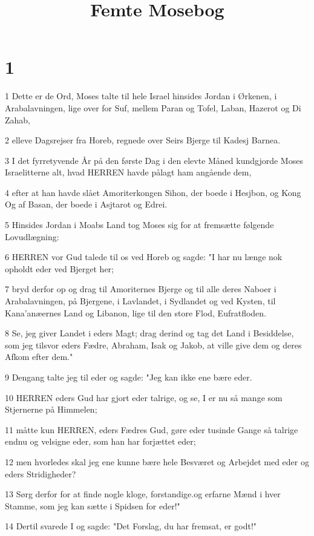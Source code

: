 

\title{Femte Mosebog}


\chapter{1}

\par 1 Dette er de Ord, Moses talte til hele Israel hinsides Jordan i Ørkenen, i Arabalavningen, lige over for Suf, mellem Paran og Tofel, Laban, Hazerot og Di Zahab,
\par 2 elleve Dagsrejser fra Horeb, regnede over Seirs Bjerge til Kadesj Barnea.
\par 3 I det fyrretyvende År på den første Dag i den elevte Måned kundgjorde Moses Israelitterne alt, hvad HERREN havde pålagt ham angående dem,
\par 4 efter at han havde slået Amoriterkongen Sihon, der boede i Hesjbon, og Kong Og af Basan, der boede i Asjtarot og Edrei.
\par 5 Hinsides Jordan i Moabs Land tog Moses sig for at fremsætte følgende Lovudlægning:
\par 6 HERREN vor Gud talede til os ved Horeb og sagde: "I har nu længe nok opholdt eder ved Bjerget her;
\par 7 bryd derfor op og drag til Amoriternes Bjerge og til alle deres Naboer i Arabalavningen, på Bjergene, i Lavlandet, i Sydlandet og ved Kysten, til Kana'anæernes Land og Libanon, lige til den store Flod, Eufratfloden.
\par 8 Se, jeg giver Landet i eders Magt; drag derind og tag det Land i Besiddelse, som jeg tilsvor eders Fædre, Abraham, Isak og Jakob, at ville give dem og deres Afkom efter dem."
\par 9 Dengang talte jeg til eder og sagde: "Jeg kan ikke ene bære eder.
\par 10 HERREN eders Gud har gjort eder talrige, og se, I er nu så mange som Stjernerne på Himmelen;
\par 11 måtte kun HERREN, eders Fædres Gud, gøre eder tusinde Gange så talrige endnu og velsigne eder, som han har forjættet eder;
\par 12 men hvorledes skal jeg ene kunne bære hele Besværet og Arbejdet med eder og eders Stridigheder?
\par 13 Sørg derfor for at finde nogle kloge, forstandige.og erfarne Mænd i hver Stamme, som jeg kan sætte i Spidsen for eder!"
\par 14 Dertil svarede I og sagde: "Det Forslag, du har fremsat, er godt!"
